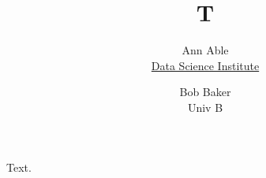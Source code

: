 \documentclass{article}
\title{T}
\author{Ann Able \\ \href{https://datascience.columbia.edu}{Data Science Institute} \and Bob Baker \\ Univ B}
\begin{document}
\maketitle
Text.
\end{document}
